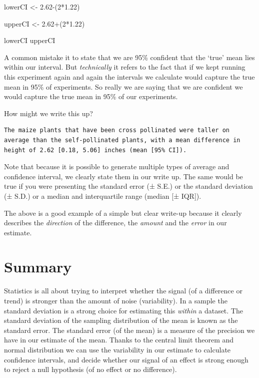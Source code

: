 \documentclass[
]{book}
\newenvironment{Shaded}{\begin{snugshade}}{\end{snugshade}}
\newcommand{\DecValTok}[1]{\textcolor[rgb]{0.00,0.00,0.81}{#1}}
\newcommand{\FloatTok}[1]{\textcolor[rgb]{0.00,0.00,0.81}{#1}}
\newcommand{\NormalTok}[1]{#1}
\newcommand{\OtherTok}[1]{\textcolor[rgb]{0.56,0.35,0.01}{#1}}
\newcommand{\SpecialCharTok}[1]{\textcolor[rgb]{0.00,0.00,0.00}{#1}}
\begin{document}
\begin{Shaded}
\begin{Highlighting}[]
\NormalTok{lowerCI }\OtherTok{\textless{}{-}} \FloatTok{2.62}\SpecialCharTok{{-}}\NormalTok{(}\DecValTok{2}\SpecialCharTok{*}\FloatTok{1.22}\NormalTok{)}

\NormalTok{upperCI }\OtherTok{\textless{}{-}} \FloatTok{2.62}\SpecialCharTok{+}\NormalTok{(}\DecValTok{2}\SpecialCharTok{*}\FloatTok{1.22}\NormalTok{)}

\NormalTok{lowerCI}
\NormalTok{upperCI}
\end{Highlighting}
\end{Shaded}

A common mistake it to state that we are 95\% confident that the `true' mean lies within our interval. But \emph{technically} it refers to the fact that if we kept running this experiment again and again the intervals we calculate would capture the true mean in 95\% of experiments. So really we are saying that we are confident we would capture the true mean in 95\% of our experiments.

How might we write this up?

\begin{verbatim}
The maize plants that have been cross pollinated were taller on average than the self-pollinated plants, with a mean difference in height of 2.62 [0.18, 5.06] inches (mean [95% CI]).
\end{verbatim}

Note that because it is possible to generate multiple types of average and confidence interval, we clearly state them in our write up. The same would be true if you were presenting the standard error (± S.E.) or the standard deviation (± S.D.) or a median and interquartile range (median {[}± IQR{]}).

The above is a good example of a simple but clear write-up because it clearly describes the \emph{direction} of the difference, the \emph{amount} and the \emph{error} in our estimate.

\hypertarget{summary}{%
\section{Summary}\label{summary}}

Statistics is all about trying to interpret whether the signal (of a difference or trend) is stronger than the amount of noise (variability). In a sample the standard deviation is a strong choice for estimating this \emph{within} a dataset. The standard deviation of the sampling distribution of the mean is known as the standard error. The standard error (of the mean) is a measure of the precision we have in our estimate of the mean. Thanks to the central limit theorem and normal distribution we can use the variability in our estimate to calculate confidence intervals, and decide whether our signal of an effect is strong enough to reject a null hypothesis (of no effect or no difference).
\end{document}
